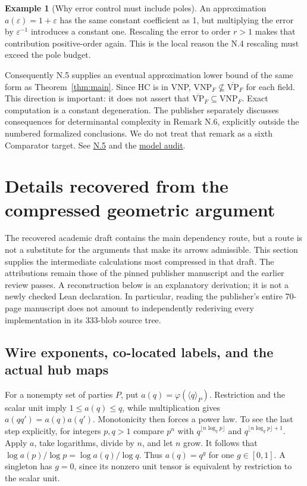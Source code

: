 \documentclass[11pt,letterpaper]{article}
\theoremstyle{definition}\newtheorem{definition}[theorem]{Definition}\newtheorem{example}[theorem]{Example}
\theoremstyle{remark}\newtheorem{remark}[theorem]{Remark}
\newcommand{\VNP}{\mathrm{VNP}}
\newcommand{\bVP}{\overline{\mathrm{VP}}}
\newcommand{\pub}[3]{\href{https://github.com/anthropics/formal-math/blob/11b6c7e3c927df2658f513b6b68ea7f8929c62c5/vp-vnp/#1\#L#2}{#3}}
\newcommand{\aud}[2]{\href{https://github.com/nousentllc/VP-VNP-Review/blob/567303d0bcf4f9d54390437b137752446e58ccd6/#1}{#2}}
\begin{document}
\begin{example}[Why error control must include poles]
An approximation $a(\varepsilon)=1+\varepsilon$ has the same constant coefficient as 1, but multiplying the error by $\varepsilon^{-1}$ introduces a constant one. Rescaling the error to order $r>1$ makes that contribution positive-order again. This is the local reason the N.4 rescaling must exceed the pole budget.
\end{example}
Consequently N.5 supplies an eventual approximation lower bound of the same form as Theorem~\ref{thm:main}. Since HC is in VNP, $\VNP_F\not\subseteq\bVP_F$ for each field. This direction is important: it does not assert that $\bVP_F\subseteq\VNP_F$. Exact computation is a constant degeneration. The publisher separately discusses consequences for determinantal complexity in Remark N.6, explicitly outside the numbered formalized conclusions. We do not treat that remark as a sixth Comparator target. See \pub{Paper/Approximate.lean}{266}{N.5} and the \aud{passes/statement-correspondence.md}{model audit}.

\section{Details recovered from the compressed geometric argument}\label{sec:geometricdetail}
The recovered academic draft contains the main dependency route, but a route is not a substitute for the arguments that make its arrows admissible. This section supplies the intermediate calculations most compressed in that draft. The attributions remain those of the pinned publisher manuscript and the earlier review passes. A reconstruction below is an explanatory derivation; it is not a newly checked Lean declaration. In particular, reading the publisher's entire 70-page manuscript does not amount to independently rederiving every implementation in its 333-blob source tree.

\subsection{Wire exponents, co-located labels, and the actual hub maps}
For a nonempty set of parties $P$, put $a(q)=\varphi(\langle q\rangle_P)$. Restriction and the scalar unit imply $1\le a(q)\le q$, while multiplication gives $a(qq')=a(q)a(q')$. Monotonicity then forces a power law. To see the last step explicitly, for integers $p,q>1$ compare $p^n$ with $q^{\lfloor n\log_qp\rfloor}$ and $q^{\lfloor n\log_qp\rfloor+1}$. Apply $a$, take logarithms, divide by $n$, and let $n$ grow. It follows that $\log a(p)/\log p=\log a(q)/\log q$. Thus $a(q)=q^g$ for one $g\in[0,1]$. A singleton has $g=0$, since its nonzero unit tensor is equivalent by restriction to the scalar unit.
\end{document}
